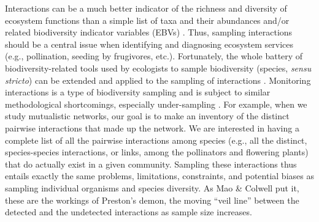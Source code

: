 \documentclass[12pt]{article}
\begin{document}
Interactions can be a much better indicator of the richness and diversity of ecosystem functions than a simple list of taxa and their abundances and\slash or related biodiversity indicator variables (EBVs) \citep{Memmott:2006vy,ValienteBanuet:2014bw}. Thus, sampling interactions should be a central issue when identifying and diagnosing ecosystem services (e.g., pollination,  seeding by frugivores, etc.). Fortunately, the whole battery of biodiversity-related tools used by ecologists to sample biodiversity (species, \emph{sensu stricto}) can be extended and applied to the sampling of interactions \citep[see Table 2 in][]{Colwell:2004fi}. Monitoring interactions is a type of biodiversity sampling and is subject to similar methodological shortcomings, especially under-sampling \citep{E31/2562,Jordano:2009c,Coddington:2009fi,Vazquez:2009p82,Dorado:2011cf,RiveraHutinel:2012vn}. For example, when we study mutualistic networks, our goal is to make an inventory of the distinct pairwise interactions that made up the network. We are interested in having a complete list of all the pairwise interactions among species (e.g., all the distinct, species-species interactions, or links, among the pollinators and flowering plants) that do actually exist in a given community. Sampling these interactions thus entails exactly the same problems, limitations, constraints, and potential biases as sampling individual organisms and species diversity. As Mao \& Colwell \citeyearpar{Mao:2005tka} put it, these are the workings of Preston’s demon, the moving ``veil line'' \citep{E2/813} between the detected and the undetected interactions as sample size increases.
\end{document}
